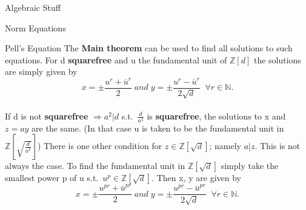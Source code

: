 \documentclass[12pt, letterpaper]{article}
\newcommand{\Z}{\mathbb{Z}}
\newcommand{\N}{\mathbb{N}}
\begin{document}
\begin{section}{Algebraic Stuff}
\begin{subsection}{Norm Equations}
\begin{subsubsection}{Pell's Equation}
    The \textbf{Main theorem} can be used to find all solutions to such
    equations. For d \textbf{squarefree} and u the fundamental unit of
    \(\Z[d]\) the solutions are simply given by \[x = \pm
      \frac{u^{r} + \overline{u} ^{r}}{2} \; and \; y = \pm \frac{u^{r} -
        \overline{u}^{r}}{2 \sqrt{d}} \;\; \forall r \in \N.\] \\
    If d is not \textbf{squarefree} \(\Rightarrow a^{2} | d\) s.t.\
    \(\frac{d}{a^{2}}\) is \textbf{squarefree}, the solutions to x and
    \(z = ay\) are the same.
    (In that case u is taken to be the fundamental unit in \(\Z
    [\sqrt{\frac{d}{a^{2}}}]\))
    There is one other condition for \(z \in \Z[\sqrt{d}]\); namely
    \(a|z\). This is not always the case. To find the fundamental unit in
    \(\Z[\sqrt{d}]\) simply take the smallest power p of u s.t.\
    \(u^{p} \in \Z[\sqrt{d}]\). Then x, y are given by \[x = \pm
      \frac{u^{pr} + \bar{u}^{pr}}{2} \; and
      \; y = \pm \frac{u^{pr} - \bar{u}^{pr}}
      {2 \sqrt{d}} \;\; \forall r \in \N.\]

    \end{subsubsection}

  \end{subsection}

\end{section}
\end{document}
